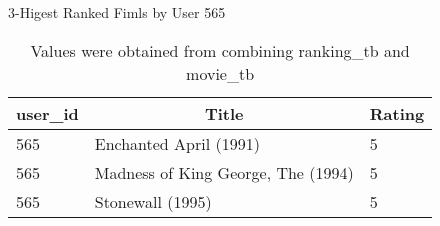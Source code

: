 \begin{table}[!htbp]
	\caption{3-Higest Ranked Fimls by User 565} \label{tab:higest-565}
	\begin{center}
	\vspace{-5mm}
		\begin{tabular}{ l l l }
			\hline
			\multicolumn{1}{c}{user\_id} & \multicolumn{1}{c}{Title} & \multicolumn{1}{c}{Rating}\\
			\hline
     		565 & Enchanted April (1991)              &      5\\
		    565 & Madness of King George, The (1994)  &      5\\
		    565 & Stonewall (1995)                    &      5\\
			\hline
		\end{tabular}
	\caption*{\scriptsize Values were obtained from combining ranking\_tb and movie\_tb}
	 \end{center}
\end{table}
